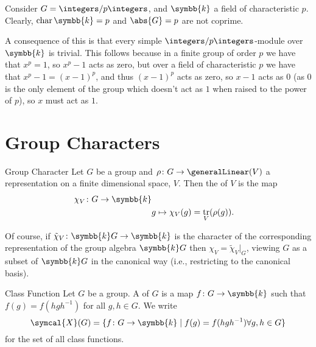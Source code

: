 \documentclass[fleqn]{NotesClass}
\renewcommand{\field}{\symbb{k}}
\DeclareMathOperator{\tr}{tr}
\DeclareMathOperator{\Char}{char}
\newcommand{\classFunctions}{\symcal{X}}
\begin{document}
    \begin{exm}{}{}
        Consider \(G = \integers/p\integers\), and \(\field\) a field of characteristic \(p\).
        Clearly, \(\Char \field = p\) and \(\abs{G} = p\) are not coprime.
        
        A consequence of this is that every simple \(\integers/p\integers\)-module over \(\field\) is trivial.
        This follows because in a finite group of order \(p\) we have that \(x^p = 1\), so \(x^p - 1\) acts as zero, but over a field of characteristic \(p\) we have that \(x^p - 1 = (x - 1)^p\), and thus \((x - 1)^p\) acts as zero, so \(x - 1\) acts as \(0\) (as \(0\) is the only element of the group which doesn't act as \(1\) when raised to the power of \(p\)), so \(x\) must act as \(1\).
    \end{exm}
    
    \section{Group Characters}
    \begin{dfn}{Group Character}{}
        Let \(G\) be a group and \(\rho \colon G \to \generalLinear(V)\) a representation on a finite dimensional space, \(V\).
        Then the  of \(V\) is the map
        \begin{align}
            \chi_V \colon G \to \field\\
            & g \mapsto \chi_V(g) = \tr_V(\rho(g)).
        \end{align}
    \end{dfn}
    Of course, if \(\tilde{\chi}_V \colon \field G \to \field\) is the character of the corresponding representation of the group algebra \(\field G\) then \(\chi_V = \tilde{\chi}_V|_G\), viewing \(G\) as a subset of \(\field G\) in the canonical way (i.e., restricting to the canonical basis).
    
    \begin{dfn}{Class Function}{}
        Let \(G\) be a group.
        A  of \(G\) is a map \(f \colon G \to \field\) such that \(f(g) = f(hgh^{-1})\) for all \(g, h \in G\).
        We write
        \begin{equation}
            \classFunctions(G) = \{f \colon G \to \field \mid f(g) = f(hgh^{-1}) \forall g, h \in G\}
        \end{equation}
        for the set of all class functions.
    \end{dfn}
    
\end{document}
